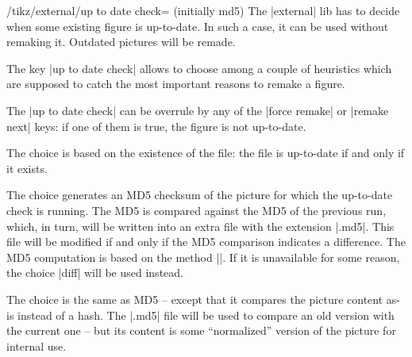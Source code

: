 {

\begin{key}{/tikz/external/up to date check= (initially md5)}
    The |external| lib has to decide when some existing figure is up-to-date.
    In such a case, it can be used without remaking it. Outdated pictures will
    be remade.

    The key |up to date check| allows to choose among a couple of heuristics
    which are supposed to catch the most important reasons to remake a figure.

    The |up to date check| can be overrule by any of the |force remake| or
    |remake next| keys: if one of them is true, the figure is not up-to-date.

    The choice  is based on the existence of the file: the file
    is up-to-date if and only if it exists.

    The choice  generates an MD5 checksum of the picture for which
    the up-to-date check is running. The MD5 is compared against the MD5 of the
    previous run, which, in turn, will be written into an extra file with the
    extension |.md5|. This file will be modified if and only if the MD5
    comparison indicates a difference. The MD5 computation is based on the
     method |\pdfmdfivesum|. If it is unavailable for some reason, the
    choice |diff| will be used instead.

    The choice  is the same as MD5 -- except that it compares the
    picture content as-is instead of a hash. The |.md5| file will be used to
    compare an old version with the current one -- but its content is some
    ``normalized'' version of the picture for internal use.


\end{key}}
